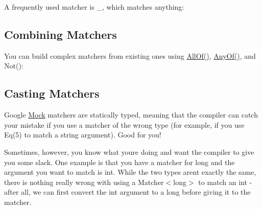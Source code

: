 A frequently used matcher is {\ttfamily \+\_\+}, which matches anything\+:


\begin{DoxyCode}{0}
\end{DoxyCode}


\subsection*{Combining Matchers}

You can build complex matchers from existing ones using {\ttfamily \mbox{\hyperlink{namespacetesting_af7618e8606c1cb45738163688944e2b7}{All\+Of()}}}, {\ttfamily \mbox{\hyperlink{namespacetesting_a81cfefd9f75cdce827d5bc873cf73aac}{Any\+Of()}}}, and {\ttfamily Not()}\+:


\begin{DoxyCode}{0}
\DoxyCodeLine{}
\end{DoxyCode}


\subsection*{Casting Matchers}

Google \mbox{\hyperlink{classMock}{Mock}} matchers are statically typed, meaning that the compiler can catch your mistake if you use a matcher of the wrong type (for example, if you use {\ttfamily Eq(5)} to match a {\ttfamily string} argument). Good for you!

Sometimes, however, you know what you\textquotesingle{}re doing and want the compiler to give you some slack. One example is that you have a matcher for {\ttfamily long} and the argument you want to match is {\ttfamily int}. While the two types aren\textquotesingle{}t exactly the same, there is nothing really wrong with using a {\ttfamily Matcher$<$long$>$} to match an {\ttfamily int} -\/ after all, we can first convert the {\ttfamily int} argument to a {\ttfamily long} before giving it to the matcher.

